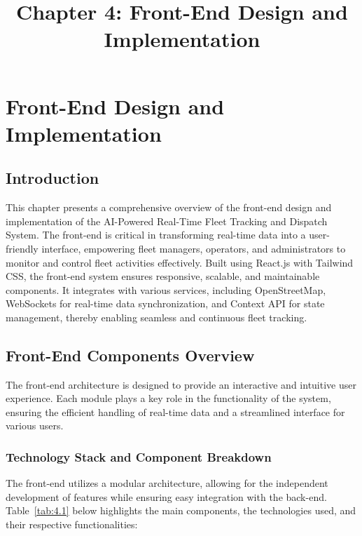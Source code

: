 \documentclass[12pt,a4paper]{report}
\title{Chapter 4: Front-End Design and Implementation}
\author{}
\date{}
\begin{document}
\maketitle

\chapter{Front-End Design and Implementation}

\section{Introduction}
This chapter presents a comprehensive overview of the front-end design and implementation of the AI-Powered Real-Time Fleet Tracking and Dispatch System. The front-end is critical in transforming real-time data into a user-friendly interface, empowering fleet managers, operators, and administrators to monitor and control fleet activities effectively. Built using React.js with Tailwind CSS, the front-end system ensures responsive, scalable, and maintainable components. It integrates with various services, including OpenStreetMap, WebSockets for real-time data synchronization, and Context API for state management, thereby enabling seamless and continuous fleet tracking.

\section{Front-End Components Overview}
The front-end architecture is designed to provide an interactive and intuitive user experience. Each module plays a key role in the functionality of the system, ensuring the efficient handling of real-time data and a streamlined interface for various users.

\subsection{Technology Stack and Component Breakdown}
The front-end utilizes a modular architecture, allowing for the independent development of features while ensuring easy integration with the back-end. Table~\ref{tab:4.1} below highlights the main components, the technologies used, and their respective functionalities:
\end{document}
